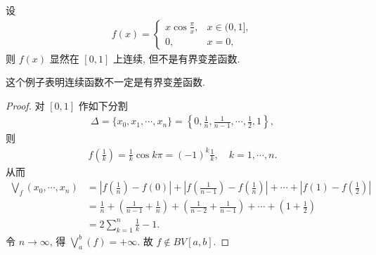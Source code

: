 \documentclass[../../main.tex]{subfiles}%
\begin{document}
\begin{example}
设
\begin{align*}
f(x) =
\begin{cases}
x\cos\frac{\pi}{x}, & x\in(0,1], \\
0, & x=0,
\end{cases}
\end{align*}
则 $f(x)$ 显然在 $[0,1]$ 上连续, 但不是有界变差函数.
\end{example}
\begin{remark}
这个例子表明连续函数不一定是有界变差函数.
\end{remark}
\begin{proof}
对 $[0,1]$ 作如下分割
\begin{align*}
\Delta = \{x_0, x_1, \cdots, x_n\} = \left\{0, \frac{1}{n}, \frac{1}{n-1}, \cdots, \frac{1}{2}, 1\right\},
\end{align*}
则
\begin{align*}
f\left(\frac{1}{k}\right) = \frac{1}{k}\cos k\pi = (-1)^k\frac{1}{k}, \quad k=1,\cdots,n.
\end{align*}
从而
\begin{align*}
\bigvee_f(x_0, \cdots, x_n) &= \left|f\left(\frac{1}{n}\right)-f(0)\right|+\left|f\left(\frac{1}{n-1}\right)-f\left(\frac{1}{n}\right)\right|+\cdots+\left|f(1)-f\left(\frac{1}{2}\right)\right| \\
&= \frac{1}{n} + \left(\frac{1}{n-1}+\frac{1}{n}\right) + \left(\frac{1}{n-2}+\frac{1}{n-1}\right) + \cdots + \left(1+\frac{1}{2}\right) \\
&= 2\sum_{k=1}^n \frac{1}{k} - 1.
\end{align*}
令 $n\to\infty$, 得 $\bigvee_a^b(f) = +\infty$. 故 $f\notin BV[a,b]$.
\end{proof}
\end{document}
